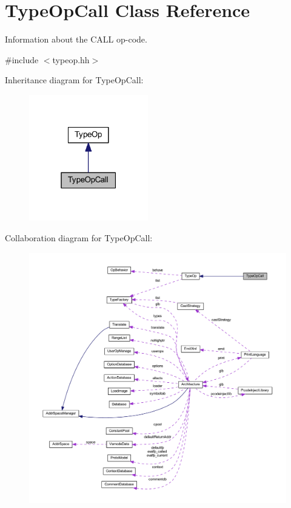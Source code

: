 \hypertarget{class_type_op_call}{}\section{Type\+Op\+Call Class Reference}
\label{class_type_op_call}


Information about the C\+A\+LL op-\/code.  




{\ttfamily \#include $<$typeop.\+hh$>$}



Inheritance diagram for Type\+Op\+Call\+:
\nopagebreak
\begin{figure}[H]
\begin{center}
\leavevmode
\includegraphics[width=147pt]{class_type_op_call__inherit__graph}
\end{center}
\end{figure}


Collaboration diagram for Type\+Op\+Call\+:
\nopagebreak
\begin{figure}[H]
\begin{center}
\leavevmode
\includegraphics[width=350pt]{class_type_op_call__coll__graph}
\end{center}
\end{figure}
